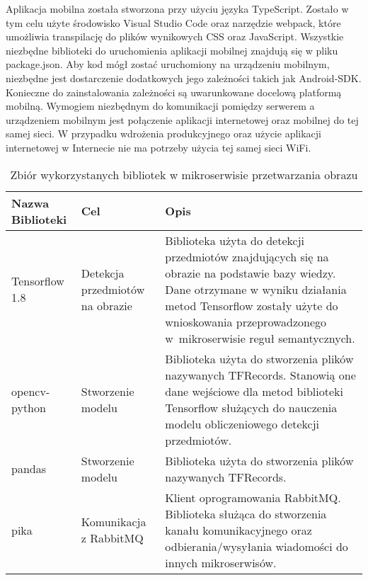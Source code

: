 Aplikacja mobilna została stworzona przy użyciu języka TypeScript. Zostało w tym celu użyte środowisko Visual Studio Code oraz narzędzie webpack, które umożliwia transpilację do plików wynikowych CSS oraz JavaScript. Wszystkie niezbędne biblioteki do uruchomienia aplikacji mobilnej znajdują się w pliku package.json. Aby kod mógł zostać uruchomiony na urządzeniu mobilnym, niezbędne jest dostarczenie dodatkowych jego zależności takich jak Android-SDK. Konieczne do zainstalowania zależności są uwarunkowane docelową platformą mobilną. Wymogiem niezbędnym do komunikacji pomiędzy serwerem a urządzeniem mobilnym jest połączenie aplikacji internetowej oraz mobilnej do tej samej sieci. W przypadku wdrożenia produkcyjnego oraz użycie aplikacji internetowej w Internecie nie ma potrzeby użycia tej samej sieci WiFi.
\newpage


\begin{center}
	\begin{longtable}{ | p{3.1cm} | p{4cm} | p{6.5cm} |}
		\caption{Zbiór wykorzystanych bibliotek w mikroserwisie przetwarzania obrazu}
		\label{librariesPython} \\
		\hline Nazwa \newline Biblioteki & Cel & Opis \\ \hline    
		
		\hline Tensorflow 1.8 &
		Detekcja przedmiotów na obrazie
		
		& Biblioteka użyta do detekcji przedmiotów znajdujących się na obrazie na podstawie bazy wiedzy. Dane otrzymane w wyniku działania metod Tensorflow zostały użyte do wnioskowania przeprowadzonego w~mikroserwisie reguł semantycznych.\\ \hline


	\hline opencv-python &
	Stworzenie modelu
	
	& Biblioteka użyta do stworzenia plików nazywanych TFRecords. Stanowią one dane wejściowe dla metod biblioteki Tensorflow służących do nauczenia modelu obliczeniowego detekcji przedmiotów.\\ \hline	
	
	\hline pandas &
	Stworzenie modelu
	
	& Biblioteka użyta do stworzenia plików nazywanych TFRecords.\\ \hline	
	
	\hline pika &
	Komunikacja z \newline RabbitMQ
	
	& Klient oprogramowania RabbitMQ. Biblioteka służąca do stworzenia kanału komunikacyjnego oraz odbierania/wysyłania wiadomości do innych mikroserwisów.\\ \hline	
	
	\end{longtable}
\end{center}

